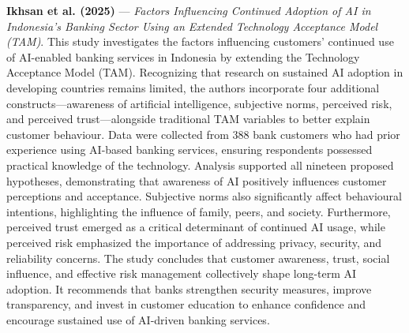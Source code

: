 \documentclass[conference]{IEEEtran}
\begin{document}
\noindent\textbf{Ikhsan et al. (2025)}\nocite{Singh2025} --- \emph{Factors Influencing Continued Adoption of AI in Indonesia's Banking Sector Using an Extended Technology Acceptance Model (TAM)}. This study investigates the factors influencing customers' continued use of AI-enabled banking services in Indonesia by extending the Technology Acceptance Model (TAM). Recognizing that research on sustained AI adoption in developing countries remains limited, the authors incorporate four additional constructs—awareness of artificial intelligence, subjective norms, perceived risk, and perceived trust—alongside traditional TAM variables to better explain customer behaviour. Data were collected from 388 bank customers who had prior experience using AI-based banking services, ensuring respondents possessed practical knowledge of the technology. Analysis supported all nineteen proposed hypotheses, demonstrating that awareness of AI positively influences customer perceptions and acceptance. Subjective norms also significantly affect behavioural intentions, highlighting the influence of family, peers, and society. Furthermore, perceived trust emerged as a critical determinant of continued AI usage, while perceived risk emphasized the importance of addressing privacy, security, and reliability concerns. The study concludes that customer awareness, trust, social influence, and effective risk management collectively shape long-term AI adoption. It recommends that banks strengthen security measures, improve transparency, and invest in customer education to enhance confidence and encourage sustained use of AI-driven banking services.

\par\medskip
\end{document}
